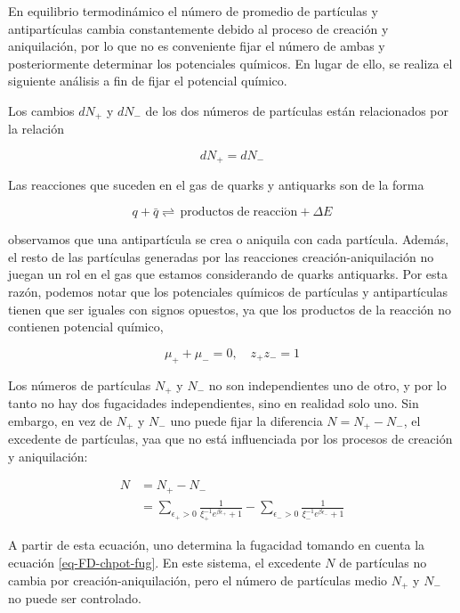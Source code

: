 En equilibrio termodinámico el número de promedio de partículas y antipartículas cambia constantemente debido al proceso de creación y aniquilación, por lo que no es conveniente fijar el número de ambas y posteriormente determinar los potenciales químicos. En lugar de ello, se realiza el siguiente análisis a fin de fijar el potencial químico.

Los cambios $d{N}_{+}$ y $d{N}_{-}$ de los dos números de partículas están relacionados por la relación

$$
d{N}_{+} = d{N}_{-}
$$

Las reacciones que suceden en el gas de quarks y antiquarks son de la forma

$$
q + \bar{q} \rightleftharpoons \, \mathrm{productos \; de \; reacci\acute{o}n} + \Delta E
$$

observamos que una antipartícula se crea o aniquila con cada partícula. Además, el resto de las partículas generadas por las reacciones creación-aniquilación no juegan un rol en el gas que estamos considerando de quarks antiquarks. Por esta razón, podemos notar que los potenciales químicos de partículas y antipartículas tienen que ser iguales con signos opuestos, ya que los productos de la reacción no contienen potencial químico,

\begin{equation}\label{eq-FD-chpot-fug}
{\mu}_{+} + {\mu}_{-} = 0, \quad {z}_{+}{z}_{-}=1
\end{equation}

Los números de partículas ${N}_{+}$ y ${N}_{-}$ no son independientes uno de otro, y por lo tanto no hay dos fugacidades independientes, sino en realidad solo uno. Sin embargo, en vez de ${N}_{+}$ y ${N}_{-}$ uno puede fijar la diferencia $N = {N}_{+} - {N}_{-}$, el excedente de partículas, yaa que no está influenciada por los procesos de creación y aniquilación:

\begin{equation}\label{eq-FD-ExcedenteNumParts}
\begin{split}
N & = {N}_{+} - {N}_{-} \\
& = \sum_{{\epsilon}_{+} > 0} \frac{1}{{\xi}_{+}^{-1}{e}^{\beta{{\epsilon}}_{+}} + 1} -\sum_{{\epsilon}_{-} > 0} \frac{1}{{\xi}_{-}^{-1}{e}^{\beta{{\epsilon}}_{-}} + 1}
\end{split}
\end{equation}

A partir de esta ecuación, uno determina la fugacidad tomando en cuenta la ecuación \eqref{eq-FD-chpot-fug}. En este sistema, el excedente $N$ de partículas no cambia por creación-aniquilación, pero el número de partículas medio ${N}_{+}$ y ${N}_{-}$ no puede ser controlado.

